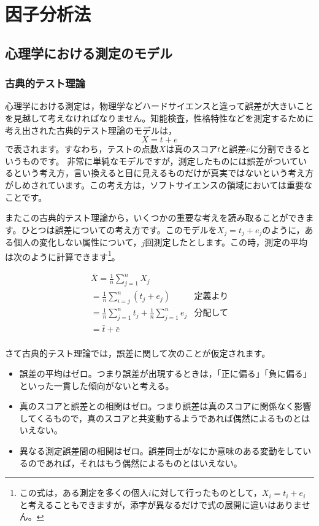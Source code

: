 \documentclass{ltjsbook}
\begin{document}
\chapter{因子分析法}
\label{L08_FacorAnalysis}

\section{心理学における測定のモデル}
\subsection{古典的テスト理論}
心理学における測定は，物理学などハードサイエンスと違って誤差が大きいことを見越して考えなければなりません。知能検査，性格特性などを測定するために考え出された古典的テスト理論のモデルは，
\[X=t+e\]
で表されます。すなわち，テストの点数$X$は真のスコア$t$と誤差$e$に分割できるというものです。
非常に単純なモデルですが，測定したものには誤差がついているという考え方，言い換えると目に見えるものだけが真実ではないという考え方がしめされています。この考え方は，ソフトサイエンスの領域においては重要なことです。

またこの古典的テスト理論から，いくつかの重要な考えを読み取ることができます。ひとつは誤差についての考え方です。このモデルを$X_j = t_j + e_j$のように，ある個人の変化しない属性について，$j$回測定したとします。この時，測定の平均は次のように計算できます\footnote{この式は，ある測定を多くの個人$i$に対して行ったものとして，$X_i = t_i + e_i$と考えることもできますが，添字が異なるだけで式の展開に違いはありません。}。

\begin{align*}
	 & \bar{X}  =  \frac{1}{n}\sum_{j=1}^n X_j                           &             & \mbox{} \\
	 & =  \frac{1}{n}\sum_{i=j}^n (t_j + e_j)                            & \mbox{定義より}           \\
	 & =  \frac{1}{n} \sum_{j=1}^n  t_j +  \frac{1}{n} \sum_{j=1}^n  e_j & \mbox{分配して}           \\
	 & =  \bar{t} + \bar{e}                                              & \mbox{}               \\
\end{align*}

さて古典的テスト理論では，誤差に関して次のことが仮定されます。
\begin{itemize}
	\item 誤差の平均はゼロ。つまり誤差が出現するときは，「正に偏る」「負に偏る」といった一貫した傾向がないと考える。
	\item 真のスコアと誤差との相関はゼロ。つまり誤差は真のスコアに関係なく影響してくるもので，真のスコアと共変動するようであれば偶然によるものとはいえない。
	\item 異なる測定誤差間の相関はゼロ。誤差同士がなにか意味のある変動をしているのであれば，それはもう偶然によるものとはいえない。
\end{itemize}
\end{document}
